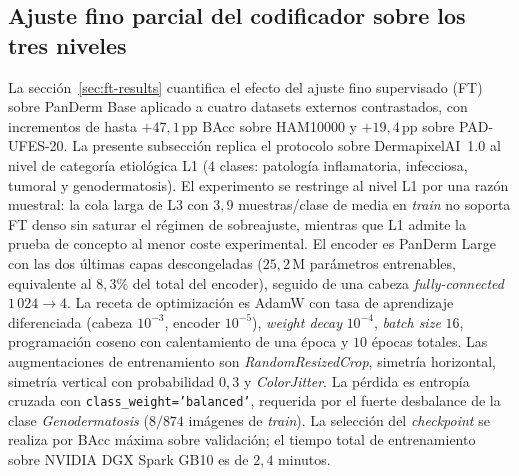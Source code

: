 \subsection*{Ajuste fino parcial del codificador sobre los tres niveles}
\label{sec:dermapixel-ft}
\label{sec:dermapixel-ft-l1}

La secci\'on~\ref{sec:ft-results} cuantifica el efecto del ajuste
fino supervisado (FT) sobre PanDerm Base aplicado a cuatro datasets
externos contrastados, con incrementos de hasta $+47{,}1$\,pp BAcc
sobre HAM10000 y $+19{,}4$\,pp sobre PAD-UFES-20. La presente
subsección replica el protocolo sobre DermapixelAI~1.0 al nivel de
categoría etiológica L1 ($4$ clases: patología inflamatoria,
infecciosa, tumoral y genodermatosis). El experimento se restringe
al nivel L1 por una razón muestral: la cola larga de L3 con
$3{,}9$ muestras/clase de media en \emph{train} no soporta FT denso
sin saturar el régimen de sobreajuste, mientras que L1 admite la
prueba de concepto al menor coste experimental. El encoder es
PanDerm Large con las dos últimas capas descongeladas
($25{,}2$\,M parámetros entrenables, equivalente al $8{,}3\%$
del total del encoder), seguido de una cabeza
\emph{fully-connected} $1\,024 \to 4$. La receta de optimización
es AdamW con tasa de aprendizaje diferenciada (cabeza $10^{-3}$,
encoder $10^{-5}$), \emph{weight decay} $10^{-4}$, \emph{batch
size} $16$, programación coseno con calentamiento de una época y
$10$ épocas totales. Las augmentaciones de entrenamiento son
\emph{RandomResizedCrop}, simetría horizontal, simetría vertical
con probabilidad $0{,}3$ y \emph{ColorJitter}. La pérdida es
entropía cruzada con \texttt{class\_weight='balanced'}, requerida
por el fuerte desbalance de la clase \emph{Genodermatosis}
($8 / 874$ imágenes de \emph{train}). La selección del
\emph{checkpoint} se realiza por BAcc máxima sobre validación; el
tiempo total de entrenamiento sobre NVIDIA DGX Spark GB10 es de
$2{,}4$ minutos.

